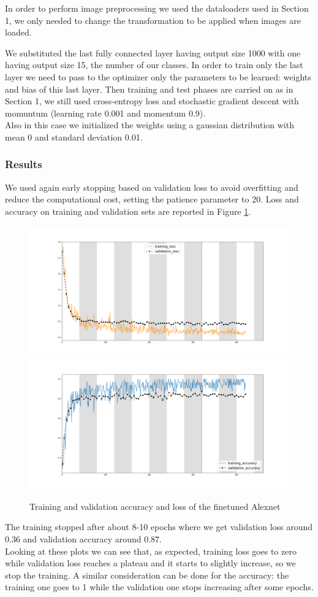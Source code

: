\documentclass[12pt, a4paper]{report}
\begin{document}
In order to perform image preprocessing we used the dataloaders used in Section 1, we only needed to change the transformation to be applied when images are loaded.

We substituted the last fully connected layer having output size 1000 with one having output size 15, the number of our classes. In order to train only the last layer we need to pass to the optimizer only the parameters to be learned: weights and bias of this last layer. Then training and test phases are carried on as in Section 1, we still used cross-entropy loss and stochastic gradient descent with momuntum (learning rate 0.001 and momentum 0.9).\\
Also in this case we initialized the weights using a gaussian distribution with mean 0 and standard deviation 0.01.

\subsubsection*{Results}

We used again early stopping based on validation loss to avoid overfitting and reduce the computational cost, setting the patience parameter to 20. Loss and accuracy on training and validation sets are reported in Figure \ref{fig:finetune}.

\begin{figure}[h!]
	\centering
	{\includegraphics[width=.49\textwidth]{img/loss_finetune.png}}
	{\includegraphics[width=.49\textwidth]{img/acc_finetune.png}}
	\caption{Training and validation accuracy and loss of the finetuned Alexnet}
	\label{fig:finetune}
\end{figure}

The training stopped after about 8-10 epochs where we get validation loss around 0.36 and validation accuracy around 0.87. \\
Looking at these plots we can see that, as expected, training loss goes to zero while validation loss reaches a plateau and it starts to slightly increase, so we stop the training.
A similar consideration can be done for the accuracy: the training one goes to 1 while the validation one stops increasing after some epochs.
\end{document}
